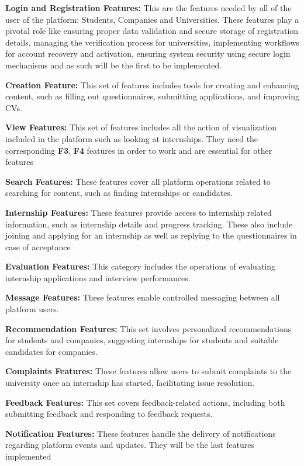 \begin{enumerate}[label={\textbf{[F\arabic*]}}, leftmargin=1.52cm]
    \item \textbf{Login and Registration Features:} This are the features needed by all of the user of the platform: Students, Companies and Universities. These features play a pivotal role like ensuring proper data validation and secure storage of registration details, managing the verification process for universities, implementing workflows for account recovery and activation, ensuring system security using secure login mechanisms and as such will be the first to be implemented.
    \item \textbf{Creation Feature:} This set of features includes tools for creating and enhancing content, such as filling out questionnaires, submitting applications, and improving CVs.
    \item \textbf{View Features:} This set of features includes all the action of visualization included in the platform such as looking at internships. They need the corresponding \textbf{F3}, \textbf{F4} features in order to work and are essential for other features
    \item \textbf{Search Features:} These features cover all platform operations related to searching for content, such as finding internships or candidates. 
    \item \textbf{Internship Features:} These features provide access to internship related information, such as internship details and progress tracking. These also include joining and applying for an internship as well as replying to the questionnaires in case of acceptance 
    \item \textbf{Evaluation Features:} This category includes the operations of evaluating internship applications and interview performances.
    \item \textbf{Message Features:} These features enable controlled messaging between all platform users.
    \item \textbf{Recommendation Features:} This set involves personalized recommendations for students and companies, suggesting internships for students and suitable candidates for companies.
    \item \textbf{Complaints Features:} These features allow users to submit complaints to the university once an internship has started, facilitating issue resolution.
    \item \textbf{Feedback Features:} This set covers feedback-related actions, including both submitting feedback and responding to feedback requests.
    \item \textbf{Notification Features:} These features handle the delivery of notifications regarding platform events and updates. They will be the last features implemented
    

\end{enumerate}

